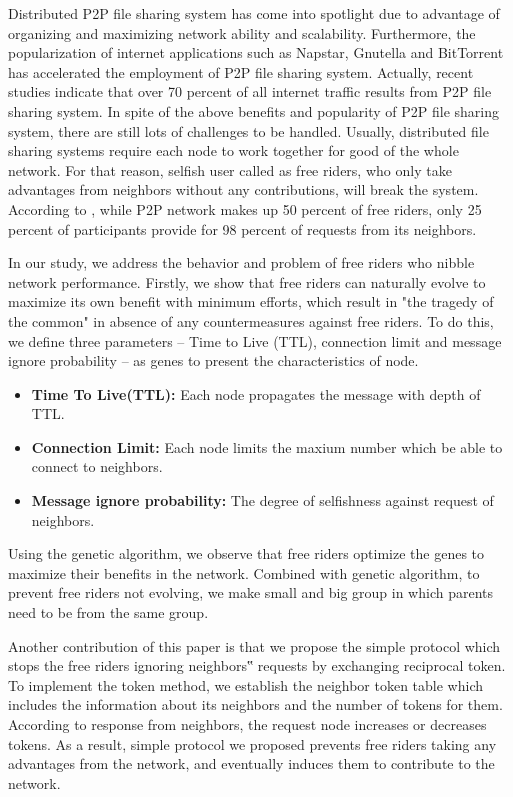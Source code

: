 \documentclass[12pt,journal,draftcls,letterpaper,onecolumn]{IEEEtran}
\begin{document}
Distributed P2P file sharing system has come into spotlight due to advantage of organizing
and maximizing network ability and scalability. Furthermore, the popularization of internet
applications such as Napstar\cite{napster}, Gnutella\cite{gnutella} and BitTorrent\cite{bittorrent} has accelerated the
employment of P2P file sharing system. Actually, recent studies indicate that over
70 percent of all internet traffic results from P2P file sharing system. In spite of the above benefits
and popularity of P2P file sharing system, there are still lots of challenges to be handled.
Usually, distributed file sharing systems require each node to work together for good of the
whole network. For that reason, selfish user called as free riders, who only take advantages
from neighbors without any contributions, will break the system. According to \cite{hd:belltoll}, while P2P
network makes up 50 percent of free riders, only 25 percent of participants provide for 98
percent of requests from its neighbors.

In our study, we address the behavior and problem of free riders who nibble network
performance. Firstly, we show that free riders can naturally evolve to maximize its own
benefit with minimum efforts, which result in "the tragedy of the common\cite{tc:tragedy}" in absence of
any countermeasures against free riders. To do this, we define three parameters – Time to
Live (TTL), connection limit and message ignore probability – as genes to present the
characteristics of node.\\

\begin{itemize}
\item {\bf Time To Live(TTL):}
Each node propagates the message with depth of TTL.
\item {\bf Connection Limit:}
Each node limits the maxium number which be able to connect to neighbors.
\item {\bf Message ignore probability:}
The degree of selfishness against request of neighbors.\\
\end{itemize}

Using the genetic algorithm, we observe that free riders optimize the genes to maximize 
their benefits in the network. Combined with genetic algorithm, to prevent free riders not 
evolving, we make small and big group in which parents need to be from the same group.

Another contribution of this paper is that we propose the simple protocol which stops the free
riders ignoring neighbors‟ requests by exchanging reciprocal token. To implement the token
method, we establish the neighbor token table which includes the information about its
neighbors and the number of tokens for them. According to response from neighbors, the
request node increases or decreases tokens. As a result, simple protocol we proposed prevents
free riders taking any advantages from the network, and eventually induces them to
contribute to the network.
\end{document}
